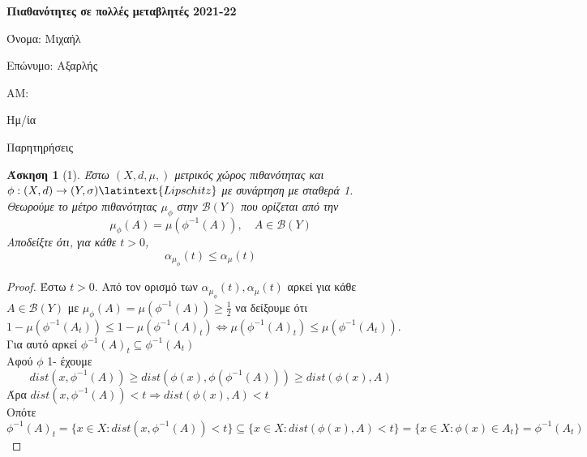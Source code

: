 \documentclass{amsbook}
\newcommand {\lt}{\latintext}
\newtheorem*{problem}{Άσκηση}
\begin{document}
	
\begin{center}
		\textbf{Πιαθανότητες σε πολλές μεταβλητές 2021-22} 
\end{center}

\vspace{1cm}
Όνομα: Μιχαήλ

Επώνυμο: Αξαρλής

ΑΜ: 

Ημ/ία

Παρητηρήσεις
\newpage

\begin{problem}[1]
Έστω \((X,d,\mu,)\) μετρικός χώρος πιθανότητας και \(\phi :(X,d) \to (Y,\sigma)
\lt{Lipschitz}\) με συνάρτηση με σταθερά 1.\\
Θεωρούμε το μέτρο πιθανότητας \(\mu_{\phi}\) στην \(\mathcal{B}(Y)\) που ορίζεται 
από την 
\[\mu_{\phi}(A) = \mu(\phi^{-1}(A)), \quad A \in \mathcal{B}(Y)\]
Αποδείξτε ότι, για κάθε \(t >0\),
\[\alpha_{\mu_{\phi}}(t) \leq \alpha_{\mu}(t)\]
\end{problem}

\begin{proof}
    Έστω \(t>0\).
    Από τον ορισμό των \(\alpha_{\mu_{\phi}}(t), \alpha_{\mu}(t)\)
    αρκεί για κάθε \(A \in \mathcal{B}(Y)\) με \(\mu_{\phi}(A) = \mu(\phi^{-1}(A)) \geq \frac{1}{2}\)
    να δείξουμε ότι \(1-\mu(\phi^{-1}(A_t)) \leq 1-\mu(\phi^{-1}(A)_t)
    \iff \mu(\phi^{-1}(A)_t) \leq \mu(\phi^{-1}(A_t))\). \\
    Για αυτό αρκεί \(\phi^{-1}(A)_t \subseteq \phi^{-1}(A_t)\)\\
    Αφού \(\phi\) 1-\lt{Lipschitz} έχουμε 
    \[dist(x,\phi^{-1}(A)) \geq dist(\phi(x),\phi(\phi^{-1}(A))) \geq 
    dist(\phi(x),A)\]
    Άρα \(dist(x,\phi^{-1}(A)) <t \Rightarrow dist(\phi(x),A) <t\)\\
    Οπότε 
    \[\phi^{-1}(A)_t = \{x \in X : dist(x,\phi^{-1}(A)) <t\} \subseteq
    \{x \in X: dist(\phi(x),A) <t\} = \{x \in X: \phi(x) \in A_t\} = \phi^{-1}(A_t)
    \]
\end{proof}
\end{document}
